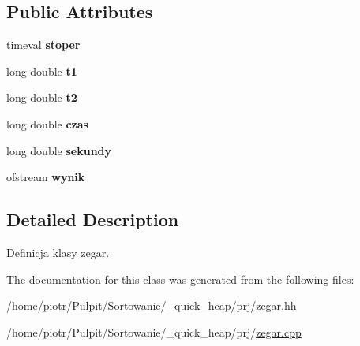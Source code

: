 \subsection*{\-Public \-Attributes}
\begin{DoxyCompactItemize}
\item 
\hypertarget{classzegar_a4c16d3b27f74dc7760b8a23269a20a7b}{timeval {\bfseries stoper}}\label{classzegar_a4c16d3b27f74dc7760b8a23269a20a7b}

\item 
\hypertarget{classzegar_aafb4ae592701809482f334fb0d3e55bf}{long double {\bfseries t1}}\label{classzegar_aafb4ae592701809482f334fb0d3e55bf}

\item 
\hypertarget{classzegar_ac32f1b83ea11b875ba4356afba430581}{long double {\bfseries t2}}\label{classzegar_ac32f1b83ea11b875ba4356afba430581}

\item 
\hypertarget{classzegar_a2249608c9a5286bba25e22a8d607dc5c}{long double {\bfseries czas}}\label{classzegar_a2249608c9a5286bba25e22a8d607dc5c}

\item 
\hypertarget{classzegar_ae51c387a5599badba9221824ae75b1de}{long double {\bfseries sekundy}}\label{classzegar_ae51c387a5599badba9221824ae75b1de}

\item 
\hypertarget{classzegar_ab52ebd6c7d2692754d05935d9b777be9}{ofstream {\bfseries wynik}}\label{classzegar_ab52ebd6c7d2692754d05935d9b777be9}

\end{DoxyCompactItemize}


\subsection{\-Detailed \-Description}
\-Definicja klasy zegar. 



\-The documentation for this class was generated from the following files\-:\begin{DoxyCompactItemize}
\item 
/home/piotr/\-Pulpit/\-Sortowanie/\-\_\-quick\-\_\-heap/prj/\hyperlink{zegar_8hh}{zegar.\-hh}\item 
/home/piotr/\-Pulpit/\-Sortowanie/\-\_\-quick\-\_\-heap/prj/\hyperlink{zegar_8cpp}{zegar.\-cpp}\end{DoxyCompactItemize}
